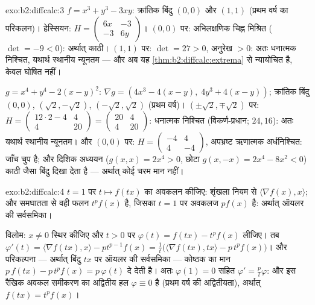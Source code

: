 \begin{solution}{exo:b2:diffcalc:3}
$f = x^3 + y^3 - 3xy$: क्रांतिक बिंदु $(0,0)$ और $(1,1)$ (प्रथम वर्ष का परिकलन)। हेस्सियन: $H = \begin{pmatrix} 6x & -3\\ -3 &
6y\end{pmatrix}$।
$(0,0)$ पर: अभिलक्षणिक चिह्न मिश्रित ($\det = -9 < 0$): अर्थात् काठी। $(1,1)$ पर: $\det = 27 > 0$,
अनुरेख $> 0$: अतः धनात्मक निश्चित, यथार्थ स्थानीय न्यूनतम --- और अब यह \cref{thm:b2:diffcalc:extrema}
से न्यायोचित है, केवल घोषित नहीं।

$g = x^4 + y^4 - 2(x-y)^2$: $\nabla g = (4x^3 - 4(x - y),\; 4y^3 +
4(x-y))$; क्रांतिक बिंदु $(0,0)$, $(\sqrt2, -\sqrt2)$, $(-\sqrt2, \sqrt2)$ (प्रथम वर्ष)। $(\pm\sqrt2, \mp\sqrt2)$ पर: $H =
\begin{pmatrix} 12\cdot2 - 4 & 4\\ 4 & 20\end{pmatrix} =
\begin{pmatrix} 20 & 4\\ 4 & 20\end{pmatrix}$: धनात्मक
निश्चित (विकर्ण-प्रधान;  $24, 16$): अतः यथार्थ स्थानीय न्यूनतम।
और $(0,0)$ पर: $H = \begin{pmatrix} -4 & 4\\ 4 & -4\end{pmatrix}$, अपभ्रष्ट ऋणात्मक अर्धनिश्चित: जाँच चुप है; और दिशिक अध्ययन
($g(x,x) = 2x^4 > 0$, छोटा $g(x,-x) = 2x^4 - 8x^2 < 0$) काठी जैसा बिंदु दिखा देता है --- अर्थात् कोई चरम मान
नहीं।
\end{solution}

\begin{solution}{exo:b2:diffcalc:4}
$t = 1$ पर $t \mapsto f(tx)$ का अवकलन कीजिए: शृंखला नियम से $\langle \nabla f(x), x\rangle$; और समघातता से वही फलन $t^pf(x)$
है, जिसका $t = 1$ पर अवकलज $pf(x)$ है: अर्थात् ऑयलर की सर्वसमिका।

विलोम: $x \neq 0$ स्थिर कीजिए और $t > 0$ पर $\varphi(t) = f(tx) - t^p f(x)$ लीजिए। तब $\varphi'(t) = \langle\nabla f(tx), x\rangle -
pt^{p-1}f(x) = \frac1t\bigl(\langle \nabla f(tx), tx\rangle -
p\,t^pf(x)\bigr)$। और परिकल्पना ---
अर्थात् बिंदु $tx$ पर ऑयलर की सर्वसमिका --- कोष्ठक का मान $p\,f(tx) - p\,t^pf(x) =
p\,\varphi(t)$ दे देती है।
अतः $\varphi(1)
= 0$ सहित $\varphi' = \frac{p}{t}\varphi$: और इस रैखिक अवकल समीकरण का अद्वितीय हल $\varphi \equiv 0$ है (प्रथम
वर्ष की अद्वितीयता), अर्थात् $f(tx) = t^pf(x)$।
\end{solution}

